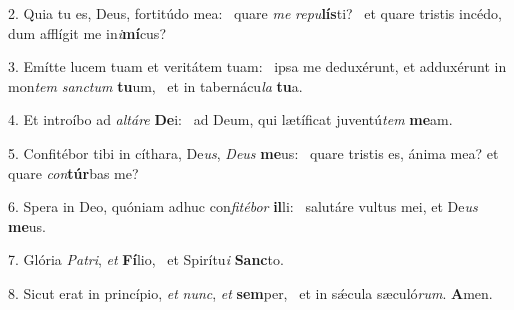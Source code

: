 2. Quia tu es, Deus, fortitúdo mea: \dag\  quare \textit{me} \textit{re}\textit{pu}\textbf{lís}ti? \ast\  et quare tristis incédo, dum afflígit me in\textit{i}\textbf{mí}cus?\

3. Emítte lucem tuam et veritátem tuam: \dag\  ipsa me deduxérunt, et adduxérunt in mon\textit{tem} \textit{sanc}\textit{tum} \textbf{tu}um, \ast\  et in tabernácu\textit{la} \textbf{tu}a.\

4. Et introíbo ad \textit{al}\textit{tá}\textit{re} \textbf{De}i: \ast\  ad Deum, qui lætíficat juventú\textit{tem} \textbf{me}am.\

5. Confitébor tibi in cíthara, De\textit{us}, \textit{De}\textit{us} \textbf{me}us: \ast\  quare tristis es, ánima mea? et quare \textit{con}\textbf{túr}bas me?\

6. Spera in Deo, quóniam adhuc con\textit{fi}\textit{té}\textit{bor} \textbf{il}li: \ast\  salutáre vultus mei, et De\textit{us} \textbf{me}us.\

7. Glória \textit{Pa}\textit{tri}, \textit{et} \textbf{Fí}lio, \ast\  et Spirítu\textit{i} \textbf{Sanc}to.\

8. Sicut erat in princípio, \textit{et} \textit{nunc}, \textit{et} \textbf{sem}per, \ast\  et in sǽcula sæculó\textit{rum}. \textbf{A}men.\

